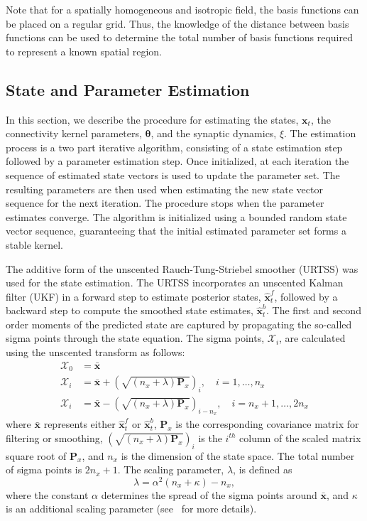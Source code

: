 \documentclass[review,authoryear,3p]{elsarticle}
\begin{document}
Note that for a spatially homogeneous and isotropic field, the basis functions can be placed on a regular grid. Thus, the knowledge of the distance between basis functions can be used to determine the total number of basis functions required to represent a known spatial region.

\subsection{State and Parameter Estimation}\label{StateAndParameterEstimationSection} In this section, we describe the procedure for estimating the states, $\mathbf{x}_t$, the connectivity kernel parameters, $\boldsymbol \theta$, and the synaptic dynamics, $\xi$. The estimation process is a two part iterative algorithm, consisting of a state estimation step followed by a parameter estimation step. Once initialized, at each iteration the sequence of estimated state vectors is used to update the parameter set. The resulting parameters are then used when estimating the new state vector sequence for the next iteration. The procedure stops when the parameter estimates converge. The algorithm is initialized using a bounded random state vector sequence, guaranteeing that the initial estimated parameter set forms a stable kernel.

The additive form of the unscented Rauch-Tung-Striebel smoother (URTSS) \citep{Sarkka2010} was used for the state estimation. The URTSS incorporates an unscented Kalman filter (UKF) \citep{Julier1997, Merwe2003} in a forward step to estimate posterior states, $\hat{\mathbf x}_t^{f}$, followed by a backward step to compute the smoothed state estimates, $\hat{\mathbf x}_t^{b}$. The first and second order moments of the predicted state are captured by propagating the so-called sigma points through the state equation. The sigma points, $\mathcal X_i$, are calculated using the unscented transform as follows:
\begin{align}\label{eq:sigmapoints1}
	\mathcal X_{0}&=\mathbf{\bar x} \\
	\mathcal X_{i}&= \mathbf{\bar x}+\left(\sqrt{( n_x + \lambda)\mathbf P_x}\right)_i, \quad i=1, \dots, n_x \\
	\mathcal X_{i}&=\mathbf{\bar x}-\left(\sqrt{( n_x + \lambda)\mathbf P_x}\right)_{i- n_x}, \quad i= n_x+1, \dots, 2n_x 
\end{align}
where $\mathbf{\bar x}$ represents either $\hat{\mathbf x}_t^{f}$ or $\hat{\mathbf x}_t^{b}$, $\mathbf{P}_x$ is the corresponding covariance matrix for filtering or smoothing, $\left(\sqrt{( n_x + \lambda)\mathbf P_x}\right)_i$ is the $i^{th}$ column of the scaled matrix square root of $\mathbf P_x$, and $n_x$ is the dimension of the state space. The total number of sigma points is $2n_x+1$. The scaling parameter, $\lambda$, is defined as 
\begin{equation}\label{eq:sigmapoints3}
	\lambda=\alpha^2( n_x+\kappa) - n_x, 
\end{equation}
where the constant $\alpha$ determines the spread of the sigma points around $\mathbf{\bar x}$, and $\kappa$ is an additional scaling parameter (see~\citet{Haykin2001} for more details). 
\end{document}
